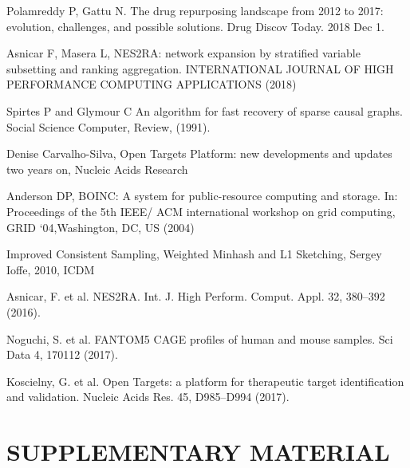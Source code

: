 \documentclass[fleqn,10pt]{SelfArx} %
\begin{document}


\begin{thebibliography}{1}
	
	 Polamreddy P, Gattu N. The drug repurposing landscape from 2012 to 2017: evolution, challenges, and possible solutions. Drug Discov Today. 2018 Dec 1.	

	 Asnicar F, Masera L, NES2RA: network expansion by stratified variable subsetting and ranking aggregation. INTERNATIONAL JOURNAL OF HIGH PERFORMANCE COMPUTING APPLICATIONS (2018)
	
	Spirtes P and Glymour C An algorithm for fast recovery
of sparse causal graphs. Social Science Computer, Review, (1991).  

	Denise Carvalho-Silva, Open Targets Platform: new developments and updates two years on, Nucleic Acids Research 

	Anderson DP, BOINC: A system for public-resource computing and storage. In: Proceedings of the 5th IEEE/ ACM international workshop on grid computing, GRID ‘04,Washington, DC, US (2004)
	
	Improved Consistent Sampling, Weighted Minhash and L1 Sketching, Sergey Ioffe, 2010, ICDM
	
	 Asnicar, F. et al. NES2RA. Int. J. High Perform. Comput. Appl. 32, 380–392 (2016).
	
	
	 Noguchi, S. et al. FANTOM5 CAGE profiles of human and mouse samples. Sci Data 4, 170112 (2017).
	
	
	 Koscielny, G. et al. Open Targets: a platform for therapeutic target identification and validation. Nucleic Acids Res. 45, D985–D994 (2017).
	
	
\end{thebibliography}


\pagebreak
\onecolumn

\section*{SUPPLEMENTARY MATERIAL}
\renewcommand{\arraystretch}{1.05}
\end{document}
